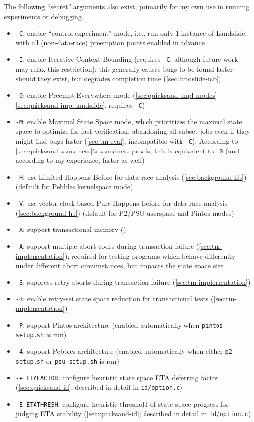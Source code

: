 The following ``secret'' arguments also exist, primarily for my own use in running experiments or debugging.

\begin{itemize}
	\item {\tt -C}: enable ``control experiment'' mode, i.e., run only 1 instance of Landslide, with all (non-data-race) preemption points enabled in advance
	\item {\tt -I}: enable Iterative Context Bounding (requires {\tt -C}, although future work may relax this restriction);
		this generally causes bugs to be found faster should they exist, but degrades completion time
		(\cref{sec:landslide-icb})
	\item {\tt -0}: enable Preempt-Everywhere mode
		(\cref{sec:quicksand-impl-modes}, \cref{sec:quicksand-impl-landslide}, requires {\tt -C})
	\item {\tt -M}: enable Maximal State Space mode,
		which prioritizes the maximal state space to optimize for fast verification,
		abandoning all subset jobs even if they might find bugs faster
		(\cref{sec:tm-eval}, incompatible with {\tt -C}).
		According to \cref{sec:quicksand-soundness}'s soundness proofs,
		this is equivalent to {\tt -0}
		(and according to my experience,  faster as well).
	\item {\tt -H}: use Limited Happens-Before for data-race analysis (\cref{sec:background-hb})
		(default for Pebbles kernelspace mode)
	\item {\tt -V}: use vector-clock-based Pure Happens-Before for data-race analysis (\cref{sec:background-hb})
		(default for P2/PSU userspace and Pintos modes)
	\item {\tt -X}: support transactional memory ()
	\item {\tt -A}: support multiple abort codes during transaction failure (\cref{sec:tm-implementation});
		required for testing programs which behave differently under different abort circumstances,
		but impacts the state space size
	\item {\tt -S}: suppress retry aborts during transaction failure (\cref{sec:tm-implementation})
	\item {\tt -R}: enable retry-set state space reduction for transactional tests (\cref{sec:tm-implementation})
	\item {\tt -P}: support Pintos architecture (enabled automatically when {\tt pintos-setup.sh} is run)
	\item {\tt -4}: support Pebbles architecture (enabled automatically when either {\tt p2-setup.sh} or {\tt psu-setup.sh} is run)
	\item {\tt -e ETAFACTOR}: configure heuristic state space ETA deferring factor (\cref{sec:quicksand-id}; described in detail in {\tt id/option.c})
	\item {\tt -E ETATHRESH}: configure heuristic threshold of state space progress for judging ETA stability (\cref{sec:quicksand-id}; described in detail in {\tt id/option.c})
\end{itemize}

